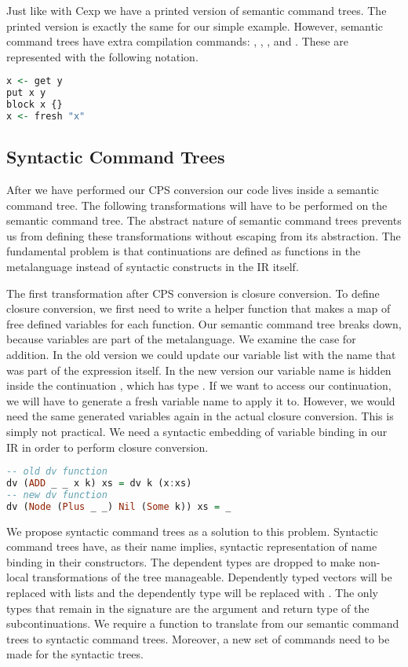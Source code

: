 Just like with \ac{Cexp} we have a printed version of semantic command trees. The printed version is exactly the same for our simple example. However, semantic command trees have extra compilation commands: , , , and . These are represented with the following notation.

\begin{lstlisting}[language=Haskell]
x <- get y
put x y
block x {}
x <- fresh "x"
\end{lstlisting}

\subsection{\label{subsection:syntree}Syntactic Command Trees}
After we have performed our \ac{CPS} conversion our code lives inside a semantic command tree. The following transformations will have to be performed on the semantic command tree. The abstract nature of semantic command trees prevents us from defining these transformations without escaping from its abstraction. The fundamental problem is that continuations are defined as functions in the metalanguage instead of syntactic constructs in the \ac{IR} itself.

The first transformation after \ac{CPS} conversion is closure conversion. To define closure conversion, we first need to write a helper function  that makes a map of free defined variables for each function. Our semantic command tree breaks down, because variables are part of the metalanguage. We examine the case for addition. In the old version we could update our variable list with the name  that was part of the  expression itself. In the new version our variable name is hidden inside the continuation , which has type . If we want to access our continuation, we will have to generate a fresh variable name to apply it to. However, we would need the same generated variables again in the actual closure conversion. This is simply not practical. We need a syntactic embedding of variable binding in our \ac{IR} in order to perform closure conversion.

\begin{lstlisting}[language=Haskell]
-- old dv function
dv (ADD _ _ x k) xs = dv k (x:xs)
-- new dv function
dv (Node (Plus _ _) Nil (Some k)) xs = _
\end{lstlisting}

We propose syntactic command trees as a solution to this problem. Syntactic command trees have, as their name implies, syntactic representation of name binding in their constructors. The dependent types are dropped to make non-local transformations of the tree manageable. Dependently typed vectors will be replaced with lists and the dependently type  will be replaced with . The only types that remain in the signature are the argument  and return type  of the subcontinuations. We require a function to translate from our semantic command trees to syntactic command trees. Moreover, a new set of commands need to be made for the syntactic trees.

